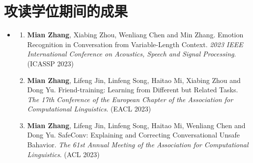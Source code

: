 \chapter{攻读学位期间的成果}

\begin{itemize}
	
	\item \textbf{\heiti{}}
	      \begin{enumerate}
	      	\setlength{\itemsep}{-\itemsep}  %
	      	\item \textbf{Mian Zhang}, Xiabing Zhou, Wenliang Chen and Min Zhang. Emotion Recognition in Conversation from Variable-Length Context. \textit{2023     IEEE International Conference on Acoustics, Speech and Signal Processing}. (ICASSP 2023)
	      	
                \item \textbf{Mian Zhang}, Lifeng Jin, Linfeng Song, Haitao Mi, Xiabing Zhou and Dong Yu. Friend-training: Learning from Different but Related Tasks. \textit{The 17th Conference of the European Chapter of the Association for Computational Linguistics}. (EACL 2023)

	      	\item \textbf{Mian Zhang}, Lifeng Jin, Linfeng Song, Haitao Mi, Wenliang Chen and Dong Yu. SafeConv: Explaining and Correcting Conversational Unsafe Bahavior. \textit{The 61st Annual Meeting of the Association for Computational Linguistics}. (ACL 2023)
	      	      
	      	      
	      	      
	      \end{enumerate}
	      
	      
\end{itemize}
